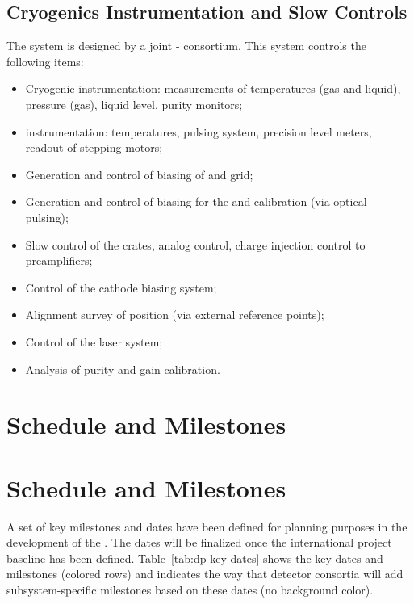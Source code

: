 \subsection{Cryogenics Instrumentation and Slow Controls}
\label{sec:dp-execsum-sc}
The  system is designed by a joint - consortium. 
This system controls the following items:

\begin{itemize}
\item Cryogenic instrumentation: measurements of temperatures (gas and liquid), pressure (gas), liquid level, purity monitors;
\item {} instrumentation: temperatures, pulsing system, precision level meters, readout of  stepping motors;
\item Generation and control of  biasing of  and grid;
\item Generation and control of  biasing for the  and calibration (via optical pulsing);
\item Slow control of the  crates, analog  control, charge injection control to preamplifiers;
\item Control of the cathode  biasing system;
\item Alignment survey of  position (via external reference points);
\item Control of the laser system;
\item Analysis of  purity and   gain calibration.
\end{itemize}


\section{Schedule and Milestones}
\label{sec:fddp-exec-sched}

\section{Schedule and Milestones} 

A set of key milestones and dates  have been defined for planning purposes in the development of the .  The dates will be finalized once the international project baseline has been defined.  Table~\ref{tab:dp-key-dates} shows the key dates and milestones (colored rows) and indicates the way that detector consortia will add subsystem-specific milestones based on these dates (no background color).
 
